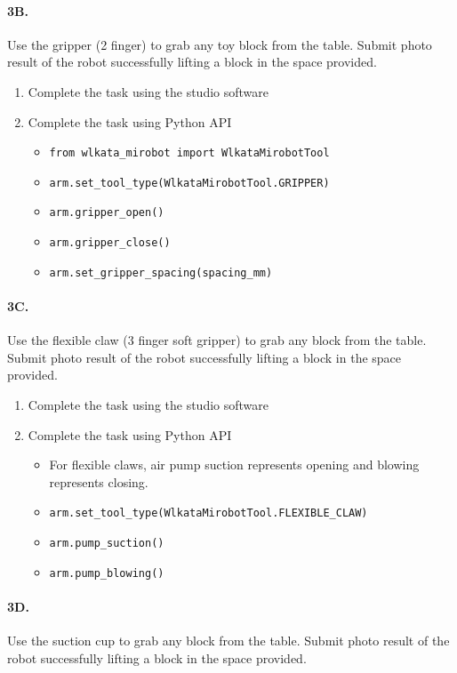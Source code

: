 \paragraph{3B.} Use the gripper (2 finger) to grab any toy block from the table. Submit photo result of the robot successfully lifting a block in the space provided.
    \begin{enumerate}
        \item Complete the task using the studio software
        \item Complete the task using Python API
        \begin{itemize}
        \item \texttt{from wlkata\_mirobot import WlkataMirobotTool}
        \item \texttt{arm.set\_tool\_type(WlkataMirobotTool.GRIPPER)}
        \item \texttt{arm.gripper\_open()}
        \item \texttt{arm.gripper\_close()}
        \item \texttt{arm.set\_gripper\_spacing(spacing\_mm)}
        \end{itemize}
    \end{enumerate}
    
\paragraph{3C.} Use the flexible claw (3 finger soft gripper) to grab any block from the table. Submit photo result of the robot successfully lifting a block in the space provided.

    
    \begin{enumerate}
        \item Complete the task using the studio software
        \item Complete the task using Python API
        \begin{itemize}
        \item For flexible claws, air pump suction represents opening and blowing represents closing.
        \item \texttt{arm.set\_tool\_type(WlkataMirobotTool.FLEXIBLE\_CLAW)}
        \item \texttt{arm.pump\_suction()}
        \item \texttt{arm.pump\_blowing()}
        \end{itemize}
    \end{enumerate}

\paragraph{3D.} Use the suction cup to grab any block from the table. Submit photo result of the robot successfully lifting a block in the space provided.

